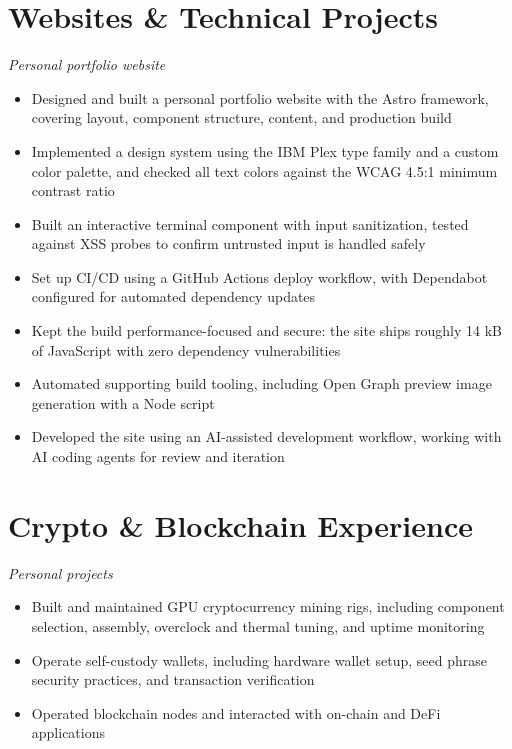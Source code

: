 \documentclass[letterpaper,10.5pt]{article}
\begin{document}
\section*{Websites \& Technical Projects}
\textit{Personal portfolio website}
\begin{itemize}
  \item Designed and built a personal portfolio website with the Astro framework, covering layout,
        component structure, content, and production build
  \item Implemented a design system using the IBM Plex type family and a custom color palette, and
        checked all text colors against the WCAG 4.5:1 minimum contrast ratio
  \item Built an interactive terminal component with input sanitization, tested against XSS probes
        to confirm untrusted input is handled safely
  \item Set up CI/CD using a GitHub Actions deploy workflow, with Dependabot configured for
        automated dependency updates
  \item Kept the build performance-focused and secure: the site ships roughly 14 kB of JavaScript
        with zero dependency vulnerabilities
  \item Automated supporting build tooling, including Open Graph preview image generation with a
        Node script
  \item Developed the site using an AI-assisted development workflow, working with AI coding agents
        for review and iteration
\end{itemize}

\section*{Crypto \& Blockchain Experience}
\textit{Personal projects}
\begin{itemize}
  \item Built and maintained GPU cryptocurrency mining rigs, including component selection,
        assembly, overclock and thermal tuning, and uptime monitoring
  \item Operate self-custody wallets, including hardware wallet setup, seed phrase security
        practices, and transaction verification
  \item Operated blockchain nodes and interacted with on-chain and DeFi applications
\end{itemize}
\end{document}
